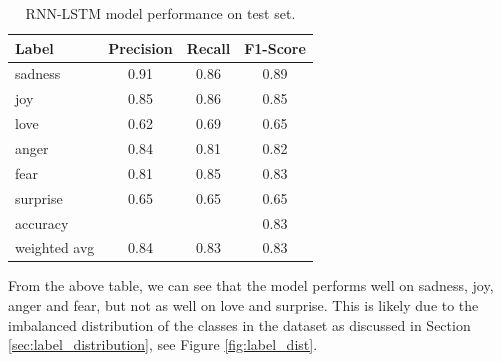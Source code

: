 \begin{table}[H]
    \vspace*{-0.5cm}
    \centering
    \begin{tabular}{|l|c|c|c|}
        \hline
        Label        & Precision & Recall & F1-Score \\ \hline
        sadness      & 0.91      & 0.86   & 0.89     \\ \hline
        joy          & 0.85      & 0.86   & 0.85     \\ \hline
        love         & 0.62      & 0.69   & 0.65     \\ \hline
        anger        & 0.84      & 0.81   & 0.82     \\ \hline
        fear         & 0.81      & 0.85   & 0.83     \\ \hline
        surprise     & 0.65      & 0.65   & 0.65     \\ \hline\hline
        accuracy     &           &        & 0.83     \\ \hline
        weighted avg & 0.84      & 0.83   & 0.83     \\ \hline
    \end{tabular}
    \caption{RNN-LSTM model performance on test set.}
    \label{tab:rnn_lstm_model_test}
    \vspace*{-0.8cm}
\end{table}

From the above table, we can see that the model performs well on sadness, joy, anger and fear, but not as well on love and surprise. This is likely due to the imbalanced distribution of the classes in the dataset as discussed in Section \ref{sec:label_distribution}, see Figure \ref{fig:label_dist}.